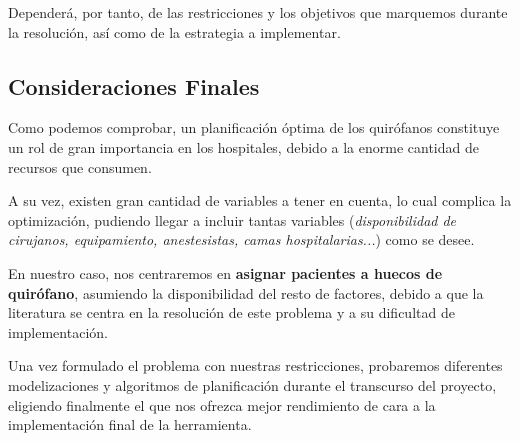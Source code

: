 Dependerá, por tanto, de las restricciones y los objetivos que marquemos durante la resolución, así como de la estrategia a implementar.

\subsection{Consideraciones Finales}

Como podemos comprobar, un planificación óptima de los quirófanos constituye un rol de gran importancia en los hospitales, debido a la enorme cantidad de recursos que consumen. 

A su vez, existen gran cantidad de variables a tener en cuenta, lo cual complica \cite{Lin2020AScheduling} la optimización, pudiendo llegar a incluir tantas variables (\textit{disponibilidad de cirujanos, equipamiento, anestesistas, camas hospitalarias...}) como se desee.

En nuestro caso, nos centraremos en \textbf{asignar pacientes a huecos de quirófano}, asumiendo la disponibilidad del resto de factores, debido a que la literatura se centra en la resolución de este problema y a su dificultad de implementación.

Una vez formulado el problema con nuestras restricciones, probaremos diferentes modelizaciones y algoritmos de planificación durante el transcurso del proyecto, eligiendo finalmente el que nos ofrezca mejor rendimiento de cara a la implementación final de la herramienta.

